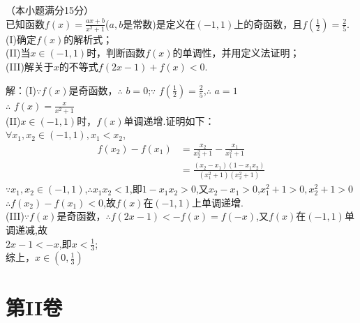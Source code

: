 \begin{exercise}
  \vspace{4cm}
  \item
    （本小题满分15分）\\
    已知函数$f(x)=\frac{ax+b}{x^2+1}$($a,b$是常数)是定义在$(-1,1)$上的奇函数，且$f(\frac{1}2)=\frac{2}5$.\\
    (I)确定$f(x)$的解析式；\\
    (II)当$x\in(-1,1)$时，判断函数$f(x)$的单调性，并用定义法证明；\\
    (III)解关于$x$的不等式$f(2x-1)+f(x)<0$.\\
    \begin{answer}
      解：(I)$\because$$f(x)$是奇函数，$\therefore$ $b=0$;$\because$ $f(\frac12)=\frac25$,$\therefore$ $a=1$\\
      $\therefore$ $f(x)=\frac{x}{x^2+1}$\\
      (II)$x\in(-1,1)$时，$f(x)$单调递增.证明如下：\\
      $\forall x_1,x_2\in(-1,1),x_1<x_2$,\\
      \begin{equation*}
        \begin{align*}
          f(x_2)-f(x_1)
          &=\frac{x_2}{x_2^2+1}-\frac{x_1}{x_1^2+1}\\
          &=\frac{(x_2-x_1)(1-x_1x_2)}{(x_1^2+1)(x_2^2+1)}
        \end{align*}
      \end{equation*}
       $\because x_1,x_2\in(-1,1)$,$\therefore x_1x_2<1$,即$1-x_1x_2>0$,又$x_2-x_1>0$,$x_1^2+1>0,x_2^2+1>0$\\
      $\therefore f(x_2)-f(x_1)<0$,故$f(x)$在$(-1,1)$上单调递增.\\
      (III)$\because f(x)$是奇函数，$\therefore f(2x-1)<-f(x)=f(-x)$,又$f(x)$在$(-1,1)$单调递减,故\\
      $2x-1<-x$,即$x<\frac13$;\\
      综上，$x\in (0,\frac13)$
    \end{answer}
\vspace{-2em}
\part{第II卷}
\vspace{-1.5em}

\end{exercise}
